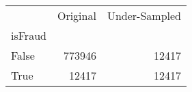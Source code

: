 \begin{tabu}{lrr}
\toprule
 & Original & Under-Sampled \\
isFraud &  &  \\
\midrule
False & 773946 & 12417 \\
True & 12417 & 12417 \\
\bottomrule
\end{tabu}
